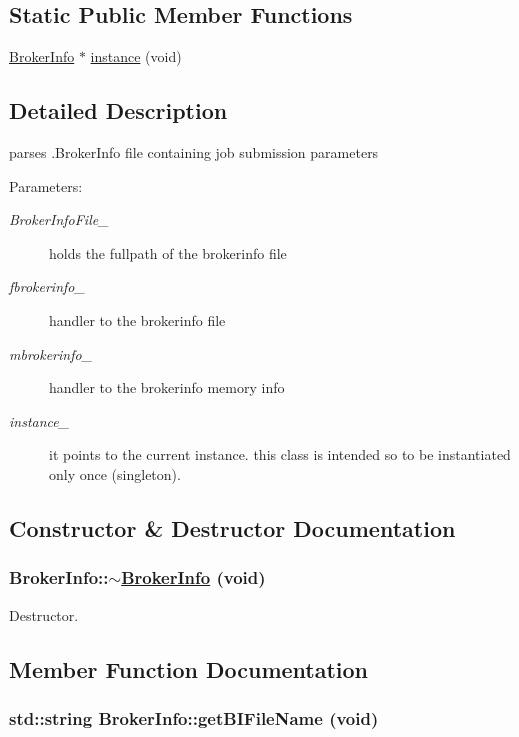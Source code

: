 \subsection*{Static Public Member Functions}
\begin{CompactItemize}
\item 
\hyperlink{classBrokerInfo}{Broker\-Info} $\ast$ \hyperlink{classBrokerInfo_e0}{instance} (void)
\end{CompactItemize}


\subsection{Detailed Description}
parses .Broker\-Info file containing job submission parameters 

\begin{Desc}
\item[Parameters:]
\begin{description}
\item[{\em Broker\-Info\-File\_\-}]holds the fullpath of the brokerinfo file \item[{\em fbrokerinfo\_\-}]handler to the brokerinfo file \item[{\em mbrokerinfo\_\-}]handler to the brokerinfo memory info \item[{\em instance\_\-}]it points to the current instance. this class is intended so to be instantiated only once (singleton). \end{description}
\end{Desc}




\subsection{Constructor \& Destructor Documentation}
\hypertarget{classBrokerInfo_a0}{
\subsubsection[$\sim$BrokerInfo]{\setlength{\rightskip}{0pt plus 5cm}Broker\-Info::$\sim$\hyperlink{classBrokerInfo}{Broker\-Info} (void)}}
\label{classBrokerInfo_a0}


Destructor. 

\subsection{Member Function Documentation}
\hypertarget{classBrokerInfo_a1}{
\subsubsection[getBIFileName]{\setlength{\rightskip}{0pt plus 5cm}std::string Broker\-Info::get\-BIFile\-Name (void)}}
\label{classBrokerInfo_a1}


